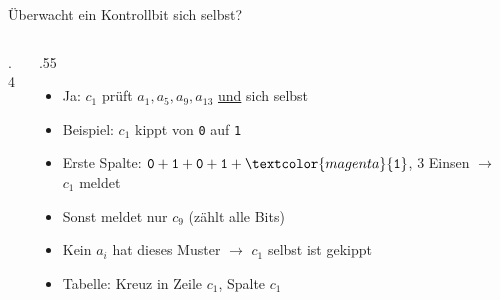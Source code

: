 \begin{frame}{Überwacht ein Kontrollbit sich selbst?}
    \begin{columns}
        \begin{column}{.4\textwidth}
            \begin{center}
            \end{center}
        \end{column}
        \begin{column}{.55\textwidth}
            \begin{itemize}
                \item Ja: \(c_1\) prüft \(a_1,a_5,a_9,a_{13}\) \underline{und} sich selbst
                \item<2-> Beispiel: \(c_1\) kippt von \texttt{0} auf \texttt{1}
                \item<3-> Erste Spalte: \(\texttt{0}+\texttt{1}+\texttt{0}+\texttt{1}+\textcolor{magenta}{\texttt{1}}\), 3 Einsen $\rightarrow$ \(c_1\) meldet
                \item<3-> Sonst meldet nur \(c_9\) (zählt alle Bits)
                \item<4-> Kein \(a_i\) hat dieses Muster $\rightarrow$ \(c_1\) selbst ist gekippt
                \item<4-> Tabelle: Kreuz in Zeile \(c_1\), Spalte \(c_1\)
            \end{itemize}
        \end{column}
    \end{columns}
\end{frame}



